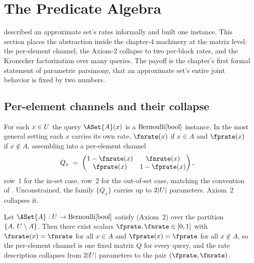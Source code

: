 %

\section{The Predicate Algebra}
\label{sec:predicate-algebra}

 described an approximate set's rates informally
and  built one instance. This section places
the abstraction inside the chapter-4 machinery at the matrix level: the
per-element channel, the Axiom-2 collapse to two per-block rates, and the
Kronecker factorization over many queries. The payoff is the chapter's
first formal statement of parametric parsimony, that an approximate set's
entire joint behavior is fixed by two numbers.

\subsection*{Per-element channels and their collapse}

For each $x \in U$ the query $\ASet{A}(x)$ is a
$\mathrm{Bernoulli}[\mathrm{bool}]$ instance. In the most general setting each $x$
carries its own rate, $\fnrate(x)$ if $x \in A$ and $\fprate(x)$ if
$x \notin A$, assembling into a per-element channel
\[
  Q_x \;=\;
  \begin{pmatrix}
    1 - \fnrate(x) & \fnrate(x) \\
    \fprate(x) & 1 - \fprate(x)
  \end{pmatrix},
\]
row~$1$ for the in-set case, row~$2$ for the out-of-set case, matching the
convention of . Unconstrained, the family
$\{Q_x\}$ carries up to $2|U|$ parameters. Axiom~2
collapses it.

\begin{proposition}
\label{prop:block-stability}
Let $\ASet{A} : \Universe \to \Bernoulli{\BoolType}$ satisfy
 (Axiom~2) over the partition $\{A,\,
U \setminus A\}$. Then there exist scalars $\fprate, \fnrate \in
[0,1]$ with $\fnrate(x) = \fnrate$ for all $x \in A$ and $\fprate(x) =
\fprate$ for all $x \notin A$, so the per-element channel is one fixed
matrix $Q$ for every query, and the rate description collapses from
$2|U|$ parameters to the pair $(\fprate, \fnrate)$.
\end{proposition}

